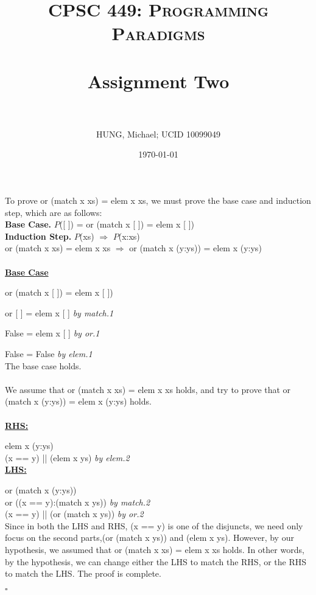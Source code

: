 \documentclass[paper=a4, fontsize=11pt]{scrartcl} %
\title{	
\normalfont \normalsize 
\textsc{CPSC 449: Programming Paradigms} \\ [25pt] %
\horrule{0.5pt} \\[0.4cm] %
\huge Assignment Two \\ %
\horrule{2pt} \\[0.5cm] %
}
\author{HUNG, Michael; UCID 10099049} %
\date{\normalsize\today} %
\begin{document}
\maketitle %


To prove or (match x xs) = elem x xs, we must prove the base case and induction step, which are as follows: \\

\textbf{Base Case.} $P$([ ]) = or (match x [ ]) = elem x [ ]) \\
\textbf{Induction Step.} $P$(xs) $\Rightarrow$ $P$(x:xs) \\
or (match x xs) = elem x xs $\Rightarrow$ or (match x (y:ys)) = elem x (y:ys)\\
\\

\textbf{\underline{Base Case}}

or (match x [ ]) = elem x [ ])

or [ ] = elem x [ ] \hspace{50pt}\textit{by match.1}

False = elem x [ ] \hspace{46pt} \textit{by or.1}

False = False \hspace{64pt} \textit{by elem.1}
\\
The base case holds.
\\
\\
We assume that or (match x xs) = elem x xs holds, and try to prove that or (match x (y:ys)) = elem x (y:ys) holds. \\
\\
\textbf{\underline{RHS:}}

elem x (y:ys)\\
(x == y) || (elem x ys) \hspace{30pt} \textit{by elem.2} \\

\textbf{\underline{LHS:}}

or (match x (y:ys)) \\
or ((x == y):(match x ys)) \hspace{12pt} \textit{by match.2} \\
(x == y) || (or (match x ys)) \hspace{12pt} \textit{by or.2} \\

Since in both the LHS and RHS, (x == y) is one of the disjuncts, we need only focus on the second parts,(or (match x ys)) and (elem x ys). However, by our hypothesis, we assumed that or (match x xs) = elem x xs holds. In other words, by the hypothesis, we can change either the LHS to match the RHS, or the RHS to match the LHS. The proof is complete.

\begin{flushright}
$\square$
\end{flushright}

\end{document}
